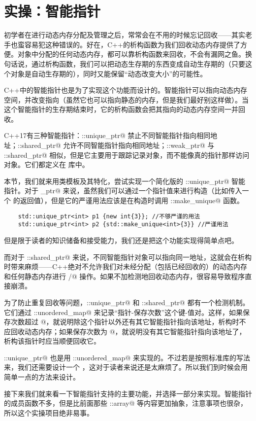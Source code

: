 \section{实操：智能指针}
初学者在进行动态内存分配及管理之后，常常会在不用的时候忘记回收——其实老手也蛮容易犯这种错误的。好在，C++的析构函数为我们回收动态内存提供了方便。对象中分配的任何动态内存，都可以靠析构函数来回收，不会有漏网之鱼。换句话说，通过析构函数，我们可以把动态生存期的东西变成自动生存期的（只要这个对象是自动生存期的），同时又能保留``动态改变大小''的可能性。\par
C++中的智能指针也是为了实现这个功能而设计的。智能指针可以指向动态内存空间，并改变指向（虽然它也可以指向静态的内存，但是我们最好别这样做）。当这个智能指针的生存期结束时，它的析构函数会把其指向的动态内存空间一并回收。\par
C++17有三种智能指针：\lstinline@std::unique_ptr@ 禁止不同智能指针指向相同地址；\lstinline@std::shared_ptr@ 允许不同智能指针指向相同地址；\lstinline@std::weak_ptr@ 与 \lstinline@std::shared_ptr@ 相似，但是它主要用于跟踪记录对象，而不能像真的指针那样访问对象。它们都定义在 \lstinline@memory@ 库中。\par
本节，我们就来用类模板及其特化，尝试实现一个简化版的 \lstinline@std::unique_ptr@ 智能指针。对于 \lstinline@unique_ptr@ 来说，虽然我们可以通过一个指针值来进行构造（比如传入一个 \lstinline@new@ 的返回值），但是它的严谨用法应该是在构造时调用 \lstinline@std::make_unique@ 函数。
\begin{lstlisting}
    std::unique_ptr<int> p1 {new int{3}}; //不够严谨的用法
    std::unique_ptr<int> p2 {std::make_unique<int>{3}} //严谨用法
\end{lstlisting}
但是限于读者的知识储备和接受能力，我们还是把这个功能实现得简单点吧。\par
而对于 \lstinline@std::shared_ptr@ 来说，不同智能指针对象可以指向同一地址，这就会在析构时带来麻烦——C++绝对不允许我们对未经分配（包括已经回收的）的动态内存和任何静态内存进行 \lstinline@delete@/\lstinline@delete[]@ 操作。如果不加检测地回收动态内存，很容易导致程序直接崩溃。\par
为了防止重复回收等问题，\lstinline@std::unique_ptr@ 和 \lstinline@std::shared_ptr@ 都有一个检测机制。它们通过 \lstinline@std::unordered_map@ 来记录``指针-保存次数''这个键-值对。这样，如果保存次数超过 @，就说明除这个指针以外还有其它智能指针指向该地址，析构时不应回收动态内存；如果保存次数为 @，就说明没有其它智能指针指向该地址了，析构该指针时应当顺便回收它。\par
\lstinline@std::unique_ptr@ 也是用 \lstinline@std::unordered_map@ 来实现的。不过若是按照标准库的写法来，我们还需要设计一个 \lstinline@hash@，这对于读者来说还是太麻烦了。所以我们到时候会用简单一点的方法来设计。\par
接下来我们就来看一下智能指针支持的主要功能，并选择一部分来实现。智能指针的成员函数不多，但是比前面那些 \lstinline@std::array@ 等内容更加抽象，注意事项也很杂，所以这个实操项目绝非易事。\par
